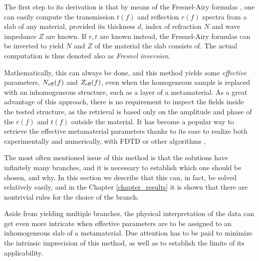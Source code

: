 The first step to its derivation is that by means of the Fresnel-Airy formulas \cite[p. 329]{born1999book},
one can easily compute the transmission $t(f)$ and reflection $r(f)$ spectra from a slab of any material, provided its thickness $d$, index of refraction $N$ and wave impedance $Z$ are known.  If $r,t$ are known instead, the Fresnel-Airy formulas can be inverted to yield $N$ and $Z$ of the material the slab consists of. The actual computation is thus denoted also as \textit{Fresnel inversion}.

Mathematically, this can always be done, and this method yields some \textit{effective} parameters, $N_{\text{eff} }(f)$ and $Z_{\text{eff} }(f)$, even when the homogeneous sample is replaced with an inhomogeneous structure, such as a layer of a metamaterial. As a great advantage of this approach, there is no requirement to inspect the fields inside the tested structure, as the retrieval is based only on the amplitude and phase of the  $r(f)$ and $t(f)$ outside the material. It has become a popular way to retrieve the effective metamaterial parameters thanks to its ease to realize both experimentally and numerically, with FDTD or other algorithms \cite{terao2011},

The most often mentioned issue of this method is that the solutions have infinitely many branches, and it is necessary to establish which one should be chosen, and why. In this section we describe that this can, in fact, be solved relatively easily, and in the Chapter \ref{chapter_results} it is shown that there are nontrivial rules for the choice of the branch.

Aside from yielding multiple branches, the physical interpretation of the data can get even more intricate when effective parameters are to be assigned to an inhomogeneous slab of a metamaterial. Due attention has to be paid to minimize the intrinsic imprecision of this method, as well as to establish the limits of its applicability. 
